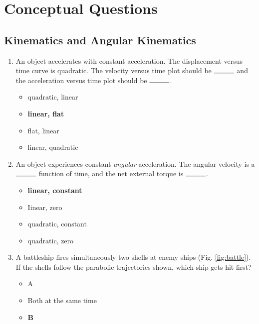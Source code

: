\documentclass[10pt]{article}
\begin{document}
\maketitle

\section{Conceptual Questions}
\subsection{Kinematics and Angular Kinematics}
\begin{enumerate}
\item An object accelerates with constant acceleration.  The displacement versus time curve is quadratic.  The velocity versus time plot should be $\rule{1cm}{0.15mm}$ and the acceleration versus time plot should be $\rule{1cm}{0.15mm}$.
\begin{itemize}
\item quadratic, linear
\item \textbf{linear, flat}
\item flat, linear
\item linear, quadratic
\end{itemize}
\item An object experiences constant \textit{angular} acceleration.  The angular velocity is a $\rule{1cm}{0.15mm}$ function of time, and the net external torque is $\rule{1cm}{0.15mm}$.
\begin{itemize}
\item \textbf{linear, constant}
\item Iinear, zero
\item quadratic, constant
\item quadratic, zero
\end{itemize}
\item A battleship fires simultaneously two shells at enemy ships (Fig. \ref{fig:battle}).  If the shells follow the parabolic trajectories shown, which ship gets hit first?
\begin{itemize}
\item A
\item Both at the same time
\item \textbf{B}
\end{itemize}
\begin{figure}[hb]
\centering

\end{figure}
\end{enumerate}
\end{document}
